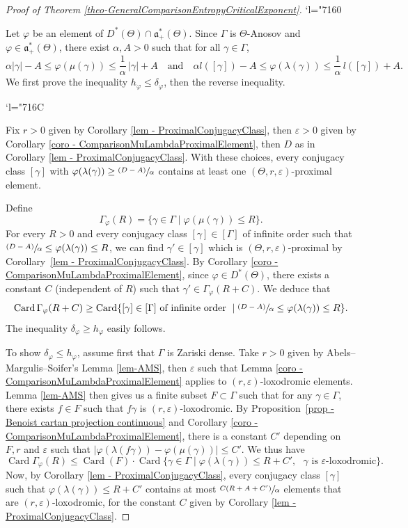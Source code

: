 \documentclass[10pt,a4paper]{article}
\newcommand{\quand}{\quad\text{and}\quad}
\newcommand{\psfrac}[2]{\sfrac{(#1)}{#2}}
\newcommand{\Changel}{\mathcode`l="7160}
\newcommand{\Changelback}{\mathcode`l="716C}
\theoremstyle{definition}
\newcommand{\fa}{\mathfrak{a}}
\DeclareMathOperator{\Card}{Card}
\let\epsilon\varepsilon
\let\phi\varphi
\let\G\Gamma
\let\g\gamma
\begin{document}
\begin{proof}[Proof of Theorem \ref{theo-GeneralComparisonEntropyCriticalExponent}]

\Changel

Let $\varphi$ be an element of $D^*(\Theta)\cap \fa_+^*(\Theta)$. Since $\Gamma$ is $\Theta$-Anosov and $\phi \in \fa_+^*(\Theta)$, there exist $\alpha, A>0$ such that for all $\g \in \G$,
\[\alpha \vert \g \vert - A \leq \phi(\mu(\g)) \leq \frac{1}{\alpha}\,\vert \g \vert + A\quand
\alpha l([\g]) - A \leq \phi(\lambda(\g)) \leq \frac{1}{\alpha}\,l([\g]) + A.\]
We first prove the inequality $h_\varphi \leq \delta_\varphi$, then the reverse inequality.

\Changelback

Fix $r>0$ given by Corollary \ref{lem - ProximalConjugacyClass}, then $\epsilon>0$ given by Corollary \ref{coro - ComparisonMuLambdaProximalElement}, then $D$ as in Corollary \ref{lem - ProximalConjugacyClass}. With these choices, every conjugacy class $[\gamma]$ with $\phi(\lambda(\g)) \geq \psfrac{D-A}{\alpha}$ contains at least one $(\Theta,r,\epsilon)$-proximal element.

Define
\[\Gamma_\phi(R) =\{\g \in \G \mid \phi(\mu(\gamma)) \leq R\}.\]
For every $R>0$ and every conjugacy class $[\g] \in [\G]$ of infinite order such that $\psfrac{D-A}{\alpha}\leq \varphi(\lambda(\g)) \leq R$, we can find $\g' \in [\g]$ which is $(\Theta,r,\epsilon)$-proximal by Corollary~\ref{lem - ProximalConjugacyClass}. By Corollary \ref{coro - ComparisonMuLambdaProximalElement}, since $\varphi \in D^*(\Theta)$, there exists a constant $C$ (independent of $R$) such that $\gamma' \in \Gamma_\phi(R+C)$. We deduce that
\[\Card \Gamma_\phi(R+C) \geq \Card \{[\g] \in [\Gamma] \textrm{ of infinite order } \mid \psfrac{D-A}{\alpha}\leq \varphi(\lambda(\g))\leq R\}.\]
The inequality $\delta_\varphi \geq h_\varphi$ easily follows.

To show $\delta_\varphi \leq h_\varphi$, assume first that $\G$ is Zariski dense. Take $r>0$ given by Abels--Margulis--Soifer's Lemma \ref{lem-AMS}, then $\epsilon$ such that Lemma \ref{coro - ComparisonMuLambdaProximalElement} applies to $(r,\epsilon)$\nobreakdash-loxo\-dromic elements. Lemma \ref{lem-AMS} then gives us a finite subset $F\subset \G $ such that for any $\g\in \G$, there exists $f\in F$ such that $f\g$ is $(r,\epsilon)$-loxodromic. By Proposition~\ref{prop - Benoist cartan projection continuous} and Corollary \ref{coro - ComparisonMuLambdaProximalElement}, there is a constant $C'$ depending on $F, r$ and $\epsilon$ such that \hbox{$|\varphi(\lambda(f\g)) - \varphi(\mu(\g))|\leq C'$}. We thus have
\[
\Card\Gamma_\phi(R) \leq \Card(F) \cdot \Card\{ \g \in \Gamma \mid \phi(\lambda(\g)) \leq R+C', \textrm{ $\g$ is $\epsilon$-loxodromic}\}.\]
Now, by Corollary \ref{lem - ProximalConjugacyClass}, every conjugacy class $[\g]$ such that $\phi(\lambda(\gamma)) \leq R+C'$ contains at most $\sfrac{C(R+A+C')}{\alpha}$ elements that are $(r,\epsilon)$-loxodromic, for the constant $C$ given by Corollary \ref{lem - ProximalConjugacyClass}.


\end{proof}
\end{document}
